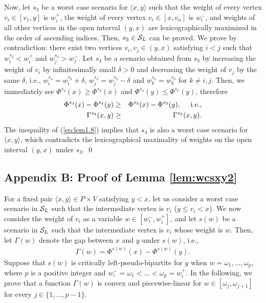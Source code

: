 \documentclass[a4paper]{llncs}
\begin{document}
Now, let $s_3$ be a worst case scenario for $\langle x, y \rangle$ such that the weight of every vertex $v_i \in [v_1, y]$ is $w^+_i$, 
the weight of every vertex $v_i \in [x, v_n]$ is $w^-_i$, and
weights of all other vertices in the open interval $(y, x)$ are lexicographically maximized in the order of ascending indices.
Then, $s_3 \in {\cal S}_L$ can be proved.
We prove by contradiction: there exist two vertices $v_i, v_j \in (y, x)$ satisfying $i < j$ such that $w^{s_3}_i < w^+_i$ and $w^{s_3}_j > w^-_j$.
Let $s_4$ be a scenario obtained from $s_3$ by increasing the weight of $v_i$ by infinitesimally small $\delta > 0$ and
decreasing the weight of $v_j$ by the same $\delta$, 
i.e., $w^{s_4}_i=w^{s_3}_i+\delta$, $w^{s_4}_j=w^{s_3}_j-\delta$ and $w^{s_4}_k=w^{s_3}_k$ for $k \not= i, j$.
Then, we immediately see $\Phi^{s_4}(x)  \ge \Phi^{s_3}(x)$ and $\Phi^{s_4}(y) \le \Phi^{s_3}(y)$, therefore
\begin{eqnarray}
\Phi^{s_4}(x)-\Phi^{s_4}(y)	&\ge&	\Phi^{s_3}(x)-\Phi^{s_3}(y), \notag \ \ \ \ \mbox{i.e.,} \\
\Gamma^{s_4}(x, y)		&\ge&	\Gamma^{s_3}(x, y).
\label{eq:lem1.8}
\end{eqnarray}
The inequality of (\ref{eq:lem1.8}) implies that $s_4$ is also a worst case scenario for $\langle x, y \rangle$,
which contradicts the lexicographical maximality of weights on the open interval $(y, x)$ under $s_3$.
\qed






\subsection*{Appendix B: Proof of Lemma \ref{lem:wcsxy2}}
\label{app:b}
For a fixed pair $\langle x, y \rangle \in P \times V$ satisfying $y < x$, 
let us consider a worst case scenario 
in ${\cal S}_L$ such that the intermediate vertex is $v_i$ ($y \le v_i < x$).
We now consider the weight of $v_i$ as a variable $w \in [w^-_i, w^+_i]$,
and let 
$s(w)$ be a scenario in ${\cal S}_L$
such that the intermediate vertex is $v_i$ whose weight is $w$.
Then, let $\Gamma(w)$ denote the gap between $x$ and $y$ under $s(w)$, i.e.,
\begin{eqnarray}
\Gamma(w) = \Phi^{s(w)}(x)-\Phi^{s(w)}(y).
\label{eq:lem1.9}
\end{eqnarray}
Suppose that $s(w)$ is critically left-pseudo-bipartite for $y$ when $w = \omega_1, \ldots, \omega_p$,
where $p$ is a positive integer and $w^-_i = \omega_1 < \ldots < \omega_p = w^+_i$.
In the following, we prove that a function $\Gamma(w)$ is convex and piecewise-linear for $w \in [\omega_j, \omega_{j+1}]$ for every $j \in \{1, \ldots, p-1\}$.
\end{document}
